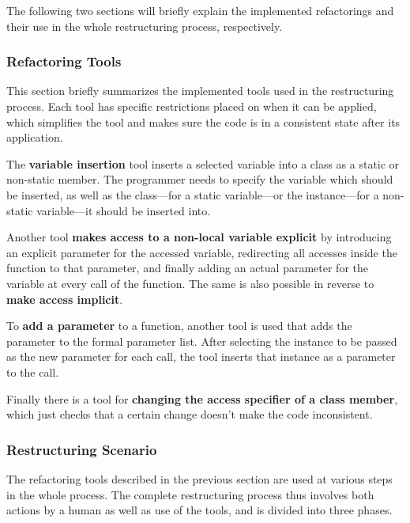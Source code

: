 \documentclass[conference,compsoc,a4paper]{IEEEtran}
\begin{document}
	The following two sections will briefly explain the implemented refactorings and their use in the whole restructuring 
	process, respectively.
	
	\subsubsection{Refactoring Tools}
	
	This section briefly summarizes the implemented tools used in the restructuring process. Each tool has specific 
	restrictions placed on when it can be applied, which simplifies the tool and makes sure the code is in a consistent 
	state after its application.
	
	The \textbf{variable insertion} tool inserts a selected variable into a class as a static or non-static member. The 
	programmer needs to specify the variable which should be inserted, as well as the class---for a static variable---or 
	the instance---for a non-static variable---it should be inserted into.
	
	Another tool \textbf{makes access to a non-local variable explicit} by introducing an explicit parameter for the 
	accessed variable, redirecting all accesses inside the function to that parameter, and finally adding an actual 
	parameter for the variable at every call of the function. The same is also possible in reverse to \textbf{make access 
		implicit}.
	
	To \textbf{add a parameter} to a function, another tool is used that adds the parameter to the formal parameter list. 
	After selecting the instance to be passed as the new parameter for each call, the tool inserts that instance as a 
	parameter to the call.
	
	Finally there is a tool for \textbf{changing the access specifier of a class member}, which just checks that a certain 
	change doesn't make the code inconsistent.
	
	\subsubsection{Restructuring Scenario}
	
	The refactoring tools described in the previous section are used at various steps in the whole process. The complete 
	restructuring process thus involves both actions by a human as well as use of the tools, and is divided into three 
	phases.
	
\end{document}
